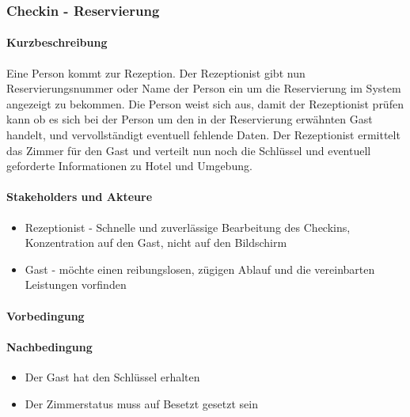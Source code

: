 \subsubsection{Checkin - Reservierung}

\paragraph{Kurzbeschreibung}
Eine Person kommt zur \Gls{Rezeption}. Der \Gls{Rezeptionist} gibt nun \Gls{Reservierungsnummer} oder Name der Person ein um die \Gls{Reservierung} im System angezeigt zu bekommen. Die Person weist sich aus, damit der \Gls{Rezeptionist} prüfen kann ob es sich bei der Person um den in der Reservierung erwähnten \Gls{Gast} handelt, und vervollständigt eventuell fehlende Daten. Der \Gls{Rezeptionist} ermittelt das \Gls{Zimmer} für den \Gls{Gast} und verteilt nun noch die Schlüssel und eventuell geforderte Informationen zu Hotel und Umgebung.

\paragraph{Stakeholders und Akteure}
\begin{itemize}
	\item \Gls{Rezeptionist} - Schnelle und zuverlässige Bearbeitung des \Gls{Checkin}s, Konzentration auf den \Gls{Gast}, nicht auf den Bildschirm
	\item \Gls{Gast} - möchte einen reibungslosen, zügigen Ablauf und die vereinbarten Leistungen vorfinden
\end{itemize}

\paragraph{Vorbedingung}

\paragraph{Nachbedingung}
\begin{itemize}
	\item Der Gast hat den Schlüssel erhalten
	\item Der Zimmerstatus muss auf Besetzt gesetzt sein
\end{itemize}
